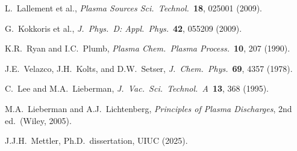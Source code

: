 \documentclass[11pt,a4paper]{article}
\begin{document}
\begin{enumerate}[label={[\arabic*]}]
\item L.\ Lallement et al., \textit{Plasma Sources Sci.\ Technol.}\ \textbf{18}, 025001 (2009).
\item G.\ Kokkoris et al., \textit{J.\ Phys.\ D: Appl.\ Phys.}\ \textbf{42}, 055209 (2009).
\item K.R.\ Ryan and I.C.\ Plumb, \textit{Plasma Chem.\ Plasma Process.}\ \textbf{10}, 207 (1990).
\item J.E.\ Velazco, J.H.\ Kolts, and D.W.\ Setser, \textit{J.\ Chem.\ Phys.}\ \textbf{69}, 4357 (1978).
\item C.\ Lee and M.A.\ Lieberman, \textit{J.\ Vac.\ Sci.\ Technol.\ A}\ \textbf{13}, 368 (1995).
\item M.A.\ Lieberman and A.J.\ Lichtenberg, \textit{Principles of Plasma Discharges}, 2nd ed.\ (Wiley, 2005).
\item J.J.H.\ Mettler, Ph.D.\ dissertation, UIUC (2025).
\end{enumerate}
\end{document}
